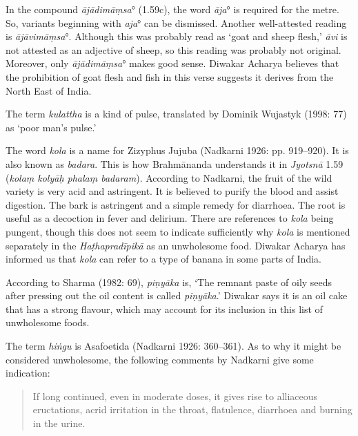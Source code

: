 \begin{ekdosis}
\begin{philcomm}[hp01_059]
In the compound \emph{ājādimāṃsa}° (1.59c), the word \emph{āja}° is required for the metre. So, variants beginning with \emph{aja}° can be dismissed. Another well-attested reading is \emph{ājāvimāṃsa}°. Although this was probably read as `goat and sheep flesh,' \emph{āvi} is not attested as an adjective of sheep, so this reading was probably not original. Moreover, only \emph{ājādimāṃsa}° makes good sense. Diwakar Acharya believes that the prohibition of goat flesh and fish in this verse suggests it derives from the North East of India.

The term \emph{kulattha} is a kind of pulse, translated by Dominik Wujastyk (1998: 77) as `poor man's pulse.'

The word \emph{kola} is a name for Zizyphus Jujuba (Nadkarni 1926: pp. 919--920). It is also known as \emph{badara}. This is how Brahmānanda understands it in \emph{Jyotsnā} 1.59 (\emph{kolaṃ kolyāḥ phalaṃ badaram}). According to Nadkarni, the fruit of the wild variety is very acid and astringent. It is believed to purify the blood and assist digestion. The bark is astringent and a simple remedy for diarrhoea. The root is useful as a decoction in fever and delirium. There are references to \emph{kola} being pungent, though this does not seem to indicate sufficiently why \emph{kola} is mentioned separately in the \emph{Haṭhapradīpikā} as an unwholesome food. Diwakar Acharya has informed us that \emph{kola} can refer to a type of banana in some parts of India.

According to Sharma (1982: 69), \emph{piṇyāka} is, ‘The remnant paste of oily seeds after pressing out the oil content is called \emph{piṇyāka}.’ Diwakar says it is an oil cake that has a strong flavour, which may account for its inclusion in this list of unwholesome foods.

The term \emph{hiṅgu} is Asafoetida (Nadkarni 1926: 360–361). As to why it might be considered unwholesome, the following comments by Nadkarni give some indication:
\begin{quote}
If long continued, even in moderate doses, it gives rise to alliaceous eructations, acrid irritation in the throat, flatulence, diarrhoea and burning in the urine.
\end{quote}

\end{philcomm}


\end{ekdosis}
